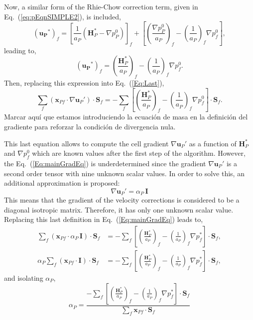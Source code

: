 \documentclass[final,3p,times,11pt,onecolumn]{myElsarticle}
\numberwithin{equation}{section}
\begin{document}
Now, a similar form of the Rhie-Chow correction term, given in Eq.~(\ref{eq:pEqnSIMPLE2}), is included,
\begin{equation}
\left(
\boldsymbol{u_P}^{*}
\right)_{f}
=
\left[\frac{1}{a_P}\left(\boldsymbol{H}_P^* - \nabla p_P^{0}\right)\right]_f
+
\left[
\left(
\frac{\nabla p_P^{0}}{a_P}
\right)_f
- 
\left(
\frac{1}{a_P}
\right)_f 
\nabla p_f^{0} 
\right],
\end{equation}
leading to, 
\begin{equation}
\left(
\boldsymbol{u_P}^{*}
\right)_{f}
=
 \left(\frac{\boldsymbol{H}_P^*}{a_P}\right)_f 
 -
 \left(\frac{1}{a_P}\right)_f \nabla p_f^{0}.
\end{equation}
Then, replacing this expression into Eq.~(\ref{Eq:Last}),
\begin{equation}
\label{Eq:mainGradEq}
\sum_f 
\left(
\boldsymbol{x}_{Pf}
\cdot 
\nabla \boldsymbol{u}_P'
\right)
\cdot 
\boldsymbol{S}_f
=
-\sum_f
\left[
\left(\frac{\boldsymbol{H}_P^*}{a_P}\right)_f 
 -
 \left(\frac{1}{a_P}\right)_f \nabla p_f^{0}
 \right]
\cdot 
\boldsymbol{S}_f.
\end{equation}
{\color{red} Marcar aquí que estamos introduciendo la ecuación de masa en la definición del gradiente para reforzar la condición de divergencia nula}.

This last equation allows to compute the cell gradient $\nabla \boldsymbol{u}_P'$ as a function of $\boldsymbol{H}_P^*$ and $\nabla p_f^{0}$ which are known values after the first step of the algorithm. However, the Eq.~(\ref{Eq:mainGradEq}) is underdetermined since the gradient $\nabla \boldsymbol{u}_P'$ is a second order tensor with nine unknown scalar values. In order to solve this, an additional approximation is proposed: 
\begin{equation}
\nabla \boldsymbol{u}_P'
=
\alpha_P\,
\boldsymbol{I}
\label{eq:gradApprox}
\end{equation}
This means that the gradient of the velocity corrections is considered to be a diagonal isotropic matrix. Therefore, it has only one unknown scalar value.
Replacing this last definition in Eq.~(\ref{Eq:mainGradEq}) leads to,
\begin{align}
\sum_f 
\left(
\boldsymbol{x}_{Pf}
\cdot 
\alpha_P\,
\boldsymbol{I}
\right)
\cdot 
\boldsymbol{S}_f
&=
-\sum_f
\left[
\left(\frac{\boldsymbol{H}_P^*}{a_P}\right)_f 
 -
 \left(\frac{1}{a_P}\right)_f \nabla p_f^{*}
 \right]
\cdot 
\boldsymbol{S}_f,
\\
\alpha_P
\sum_f 
\left(
\boldsymbol{x}_{Pf}
\cdot 
\boldsymbol{I}
\right)
\cdot 
\boldsymbol{S}_f
&=
-\sum_f
\left[
\left(\frac{\boldsymbol{H}_P^*}{a_P}\right)_f 
 -
 \left(\frac{1}{a_P}\right)_f \nabla p_f^{*}
 \right]
\cdot 
\boldsymbol{S}_f,
\end{align}
and isolating $\alpha_P$,
\begin{equation}
\alpha_P
=
\dfrac
{-\sum_f
\left[
\left(\frac{\boldsymbol{H}_P^*}{a_P}\right)_f 
 -
 \left(\frac{1}{a_P}\right)_f \nabla p_f^{*}
 \right]
\cdot 
\boldsymbol{S}_f}
{\sum_f 
\boldsymbol{x}_{Pf}
\cdot 
\boldsymbol{S}_f}
\end{equation}
\end{document}
